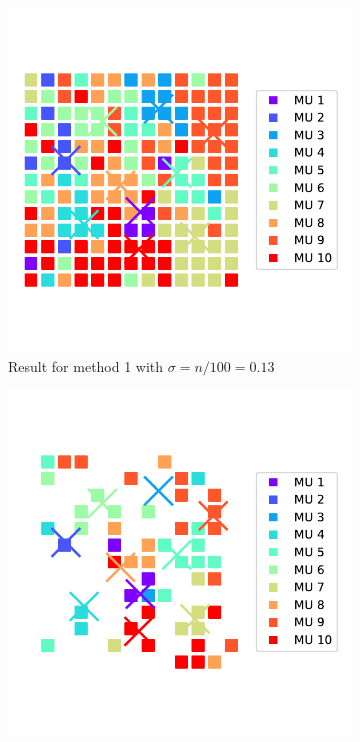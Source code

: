 \begin{figure}
\begin{subfigure}[t]{0.48\textwidth}
    \includegraphics[width=\textwidth]{images/motor_unit_assignment/MU_fibre_distribution_13x13_10_2d_fiber_distribution_sigma.pdf}%
    \caption{Result for method 1 with $\sigma = n/100 = 0.13$}%
    \label{fig:MU_fibre_distribution_13x13_10_2d_fiber_distribution_sigma}%
  \end{subfigure}
  \begin{subfigure}[t]{0.48\textwidth}%
    \centering%
    \includegraphics[width=\textwidth]{images/motor_unit_assignment/MU_fibre_distribution_sparse_13x13_10_2d_fiber_distribution.pdf}%

\end{subfigure}
\end{figure}
